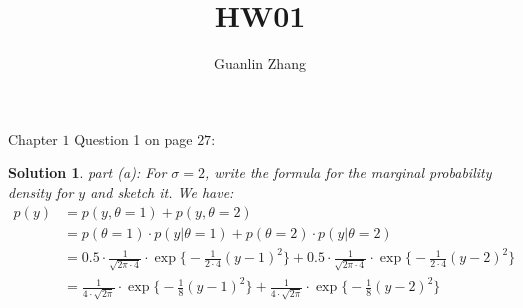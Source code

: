 \documentclass[11pt]{article}
\title{HW01}
\author{Guanlin Zhang}
\newtheorem{sol}{Solution}
\begin{document}
Chapter $1$ Question 1 on page $27$:
\begin{sol}
	part (a): For $\sigma = 2$, write the formula for the marginal probability density for $y$ and sketch it.\vskip 2mm
	We have:
	\begin{align*}
		p(y) &= p(y, \theta = 1) + p(y, \theta = 2)\\
		      & = p(\theta = 1)\cdot p(y|\theta = 1) + p(\theta = 2)\cdot p(y|\theta = 2)\\
			&= 0.5\cdot \frac{1}{\sqrt{2\pi \cdot 4}}\cdot \exp\Big\{-\frac{1}{2\cdot 4}(y - 1)^2\Big\} + 0.5\cdot \frac{1}{\sqrt{2\pi \cdot 4}}\cdot \exp\Big\{-\frac{1}{2\cdot 4}(y - 2)^2\Big\}\\
			&= \frac{1}{4\cdot \sqrt{2\pi}}\cdot \exp\Big\{-\frac{1}{8}(y - 1)^2\Big\} + \frac{1}{4\cdot \sqrt{2\pi}}\cdot \exp\Big\{-\frac{1}{8}(y - 2)^2\Big\}
	\end{align*}
	
	
	
	
	
	
	
	
	
	
	
	
	
	
	
	
	
	
	
	
	
	
	
\end{sol}
\end{document}
